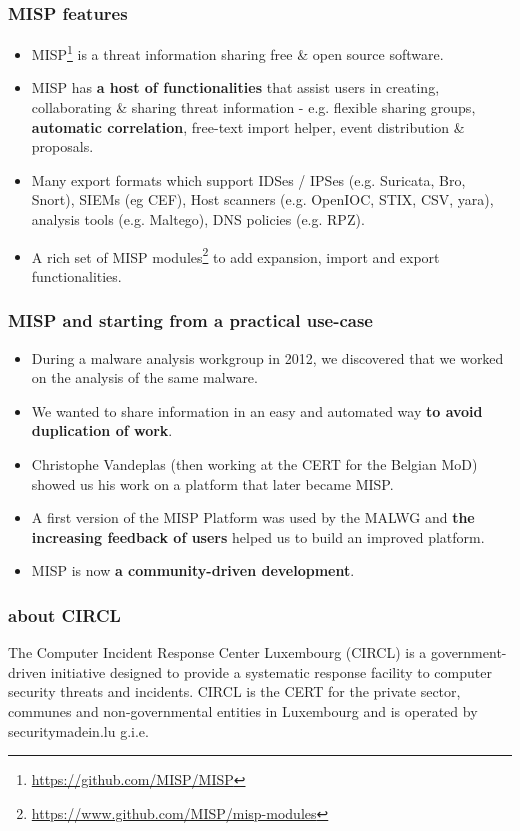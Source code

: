
\begin{frame}[t,plain]
\titlepage
\end{frame}

\begin{frame}
 \frametitle{MISP features}
 \begin{itemize}
         \item MISP\footnote{\url{https://github.com/MISP/MISP}} is a threat information sharing free \& open source software.
         \item MISP has {\bf a host of functionalities} that assist users in creating, collaborating \& sharing threat information - e.g. flexible sharing groups, {\bf automatic correlation}, free-text import helper, event distribution \& proposals.
         \item Many export formats which support IDSes / IPSes (e.g. Suricata, Bro, Snort), SIEMs (eg CEF), Host scanners (e.g. OpenIOC, STIX, CSV, yara), analysis tools (e.g. Maltego), DNS policies (e.g. RPZ).
         \item A rich set of MISP modules\footnote{\url{https://www.github.com/MISP/misp-modules}} to add expansion, import and export functionalities.
 \end{itemize}
\end{frame}

\begin{frame}
 \frametitle{MISP and starting from a practical use-case}
 \begin{itemize}
         \item During a malware analysis workgroup in 2012, we discovered that we worked on the analysis of the same malware.
         \item We wanted to share information in an easy and automated way {\bf to avoid duplication of work}.
         \item Christophe Vandeplas (then working at the CERT for the Belgian MoD) showed us his work on a platform that later became MISP.
         \item A first version of the MISP Platform was used by the MALWG and {\bf the increasing feedback of users} helped us to build an improved platform.
         \item MISP is now {\bf a community-driven development}.
 \end{itemize}
\end{frame}

\begin{frame}
\frametitle{about CIRCL}
The Computer Incident Response Center Luxembourg (CIRCL) is a government-driven initiative designed to provide a systematic response facility to computer security threats and incidents. CIRCL is the CERT for the private sector, communes and non-governmental entities in Luxembourg and is operated by securitymadein.lu g.i.e.
\end{frame}

